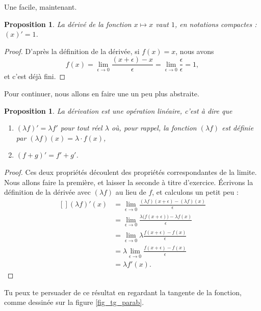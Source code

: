 \documentclass[a4paper,12pt]{book}
\newcounter{numtho}
\theoremstyle{mes_exemples}	\newtheorem{exemple}[numtho]{Exemple}
\theoremstyle{mes_tho}
\newtheorem{proposition}[numtho]{Proposition}
\begin{document}
Une facile, maintenant.
\begin{proposition}
	La dérivé de la fonction $x\mapsto x$ vaut $1$, en notations compactes : $(x)'=1$.
\end{proposition}

\begin{proof}
D'après la définition de la dérivée, si $f(x)=x$, nous avons
\begin{equation}
	f(x)=\lim_{\epsilon\to 0}\frac{ (x+\epsilon) -x }{\epsilon} =\lim_{\epsilon\to 0}\frac{ \epsilon }{\epsilon} =1,
\end{equation}
et c'est déjà fini.
\end{proof}

Pour continuer, nous allons en faire une un peu plus abstraite.
\begin{proposition}		\label{PropDerrLin}
	La dérivation est une opération linéaire, c'est à dire que
	\begin{enumerate}
		\item $(\lambda f)'=\lambda f'$ pour tout réel $\lambda$ où, pour rappel, la fonction $(\lambda f)$ est définie par $(\lambda f)(x)=\lambda\cdot f(x)$,
		\item $(f+g)'=f'+g'$.
	\end{enumerate}
\end{proposition}

\begin{proof}
Ces deux propriétés découlent des propriétés correspondantes de la limite. Nous allons faire la première, et laisser la seconde à titre d'exercice. Écrivons la définition de la dérivée avec $(\lambda f)$ au lieu de $f$, et calculons un petit peu :
\begin{equation}
	\begin{aligned}[]
		(\lambda f)'(x)	&=\lim_{\epsilon\to 0}\frac{ (\lambda f)(x+\epsilon)-(\lambda f)(x) }{ \epsilon }\\
				&=\lim_{\epsilon\to 0}\frac{ \lambda \big( f(x+\epsilon) \big)-\lambda f(x) }{ \epsilon }\\
				&=\lim_{\epsilon\to 0}\lambda \frac{ f(x+\epsilon) -f(x) }{ \epsilon }\\
				&=\lambda \lim_{\epsilon\to 0}\frac{ f(x+\epsilon) -f(x) }{ \epsilon }\\
				&=\lambda f'(x).
	\end{aligned}
\end{equation}
\end{proof}

Tu peux te persuader de ce résultat en regardant la tangente de la fonction, comme dessinée sur la figure \ref{fig_tg_parab}.

\end{document}
